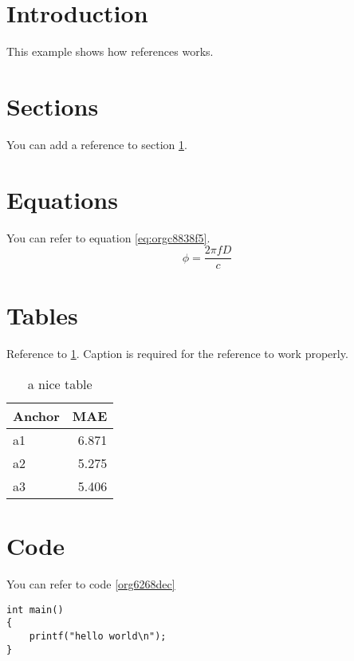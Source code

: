 


\section{Introduction}
\label{sec:org1390c74}
This example shows how references works.

\section{Sections}
\label{sec:orgdc8ac51}
You can add a reference to section \ref{sec:org1390c74}.

\section{Equations}
\label{sec:org64bdf22}
You can refer to equation \ref{eq:orgc8838f5}.
\begin{equation}
\label{eq:orgc8838f5}
\phi = \frac{2\pi fD}{c}
\end{equation}

\section{Tables}
\label{sec:orgc805c3f}
Reference to \ref{tab:org5a7dea8}.
Caption is required for the reference to work properly.

\begin{table}[htbp]
\caption{\label{tab:org5a7dea8}
a nice table}
\centering
\begin{tabular}{lr}
Anchor & MAE\\
\hline
a1 & 6.871\\
a2 & 5.275\\
a3 & 5.406\\
\end{tabular}
\end{table}

\section{Code}
\label{sec:org43ad57e}
You can refer to code \ref{org6268dec}

\begin{verbatim}
int main()
{
    printf("hello world\n");
}
\end{verbatim}



